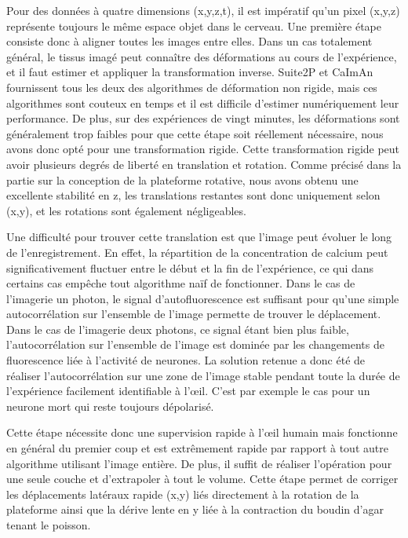 Pour des données à quatre dimensions (x,y,z,t), il est impératif qu'un pixel (x,y,z) représente toujours le même espace objet dans le cerveau. Une première étape consiste donc à aligner toutes les images entre elles. Dans un cas totalement général, le tissus imagé peut connaître des déformations au cours de l'expérience, et il faut estimer et appliquer la transformation inverse. Suite2P et CaImAn fournissent tous les deux des algorithmes de déformation non rigide, mais ces algorithmes sont couteux en temps et il est difficile d'estimer numériquement leur performance. De plus, sur des expériences de vingt minutes, les déformations sont généralement trop faibles pour que cette étape soit réellement nécessaire, nous avons donc opté pour une transformation rigide. Cette transformation rigide peut avoir plusieurs degrés de liberté en translation et rotation. Comme précisé dans la partie sur la conception de la plateforme rotative, nous avons obtenu une excellente stabilité en z, les translations restantes sont donc uniquement selon (x,y), et les rotations sont également négligeables. 

Une difficulté pour trouver cette translation est que l'image peut évoluer le long de l'enregistrement. En effet, la répartition de la concentration de calcium peut significativement fluctuer entre le début et la fin de l'expérience, ce qui dans certains cas empêche tout algorithme naïf de fonctionner. Dans le cas de l'imagerie un photon, le signal d'autofluorescence est suffisant pour qu'une simple autocorrélation sur l'ensemble de l'image permette de trouver le déplacement. Dans le cas de l'imagerie deux photons, ce signal étant bien plus faible, l'autocorrélation sur l'ensemble de l'image est dominée par les changements de fluorescence liée à l'activité de neurones. La solution retenue a donc été de réaliser l'autocorrélation sur une zone de l'image stable pendant toute la durée de l'expérience facilement identifiable à l'œil. C'est par exemple le cas pour un neurone mort qui reste toujours dépolarisé.

Cette étape nécessite donc une supervision rapide à l'œil humain mais fonctionne en général du premier coup et est extrêmement rapide par rapport à tout autre algorithme utilisant l'image entière. De plus, il suffit de réaliser l'opération pour une seule couche et d'extrapoler à tout le volume. Cette étape permet de corriger les déplacements latéraux rapide (x,y) liés directement à la rotation de la plateforme ainsi que la dérive lente en y liée à la contraction du boudin d'agar tenant le poisson.


